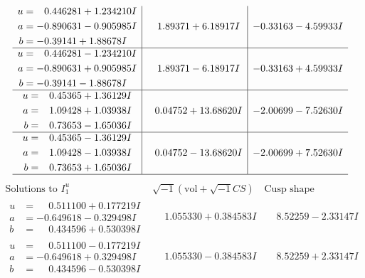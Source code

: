 \documentclass[1p]{elsarticle_modified}
\theoremstyle{definition}
\newcommand{\I}{\sqrt{-1}}
\begin{document}
$$\begin{array}{c|c|c}
\begin{aligned}
u &= \phantom{-}0.446281 + 1.234210 I \\
a &= -0.890631 - 0.905985 I \\
b &= -0.39141 + 1.88678 I\end{aligned}
 & \phantom{-}1.89371 + 6.18917 I & -0.33163 - 4.59933 I \\ \hline\begin{aligned}
u &= \phantom{-}0.446281 - 1.234210 I \\
a &= -0.890631 + 0.905985 I \\
b &= -0.39141 - 1.88678 I\end{aligned}
 & \phantom{-}1.89371 - 6.18917 I & -0.33163 + 4.59933 I \\ \hline\begin{aligned}
u &= \phantom{-}0.45365 + 1.36129 I \\
a &= \phantom{-}1.09428 + 1.03938 I \\
b &= \phantom{-}0.73653 - 1.65036 I\end{aligned}
 & \phantom{-}0.04752 + 13.68620 I & -2.00699 - 7.52630 I \\ \hline\begin{aligned}
u &= \phantom{-}0.45365 - 1.36129 I \\
a &= \phantom{-}1.09428 - 1.03938 I \\
b &= \phantom{-}0.73653 + 1.65036 I\end{aligned}
 & \phantom{-}0.04752 - 13.68620 I & -2.00699 + 7.52630 I\\
 \hline 
 \end{array}$$\newpage$$\begin{array}{c|c|c}  
\text{Solutions to }I^u_{1}& \I (\text{vol} + \sqrt{-1}CS) & \text{Cusp shape}\\
 \hline 
\begin{aligned}
u &= \phantom{-}0.511100 + 0.177219 I \\
a &= -0.649618 - 0.329498 I \\
b &= \phantom{-}0.434596 + 0.530398 I\end{aligned}
 & \phantom{-}1.055330 + 0.384583 I & \phantom{-}8.52259 - 2.33147 I \\ \hline\begin{aligned}
u &= \phantom{-}0.511100 - 0.177219 I \\
a &= -0.649618 + 0.329498 I \\
b &= \phantom{-}0.434596 - 0.530398 I\end{aligned}
 & \phantom{-}1.055330 - 0.384583 I & \phantom{-}8.52259 + 2.33147 I \\ \hline\begin{aligned}

\end{aligned}
\end{array}$$
\end{document}
